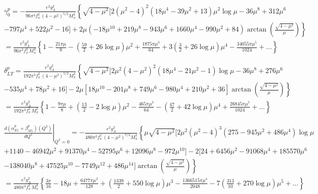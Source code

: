\documentclass[prc,twocolumn,showpacs,preprintnumbers,amsmath,amssymb
,superscriptaddress,a4paper,nofootinbib
]{revtex4-1}
\begin{document}
\begin{widetext}
\begin{align}
&\gamma_0^p = -\frac{e^2 g_A^2}{96\pi^3 f_\pi^2\,  (4-\mu^2)^{5/2} M_\pi^2} \left\{ \sqrt{4-\mu^2} [ 2(\mu^2-4)^2(18 \mu^4 - 39 \mu^2 +13) \mu^2 \log\mu -36 \mu^8 + 312 \mu^6\right. \nonumber\\
&\left.-797\mu^4 +522 \mu^2-16 ] + 2 \mu (-18 \mu^{10} + 219 \mu^8 -943 \mu^6+1660 \mu^4 -990 \mu^2 + 84) \arctan\left( \frac{\sqrt{4-\mu^2}}{\mu}\right) \right\}\nonumber \\
&=\frac{e^2 g_A^2}{96\pi^3 f_\pi^2\,  M_\pi^2}\left\{ 1-\frac{21\pi \mu}{8} - \left(\frac{59}{2} + 26 \log\mu\right)\mu^2 + \frac{1875 \pi \mu^3}{64} + 3\left(\frac{3}{2} + 26 \log\mu\right)\mu^4- \frac{34055 \pi \mu^5}{1024} + \dots \right\}
\end{align}

\begin{align}
&\delta^p_{LT} = \frac{e^2 g_A^2}{192\pi^3 f_\pi^2\, (4-\mu^2)^{5/2} M_\pi^2} \left\{ \sqrt{4-\mu^2} [ 2 \mu^2 (4-\mu^2)^2 (18 \mu^4-21 \mu^2-1) \log\mu -36 \mu^8 + 276 \mu^6 \nonumber \right.\\
&\left. -535 \mu^4+78 \mu^2 +16 ] - 2 \mu [18 \mu^{10} - 201 \mu^8 + 749 \mu^6 -980 \mu^4 +210 \mu^2 +36] \arctan\left( \frac{\sqrt{4-\mu^2}}{\mu} \right)      \right\}\nonumber \\
&=\frac{e^2 g_A^2}{192\pi^3 f_\pi^2\, M_\pi^2} \left\{ 1 - \frac{9 \pi \mu}{8} + \left(\frac{13}{2}-2\log\mu\right)\mu^2 - \frac{465 \pi \mu^3}{64} - \left(\frac{47}{2}+ 42 \log\mu\right)\mu^4  + \frac{26845 \pi \mu^5}{1024} + \dots\right\} 
\end{align}


\begin{align}
&\left.\frac{d(\alpha_{E1}^p+\beta_{M1}^p) (Q^2)}{dQ^2}\right|_{Q^2=0}=-\frac{e^2 g_A^2}{480 \pi^3 f_\pi^2\,  (4-\mu^2)^{7/2} M_\pi^3}\left\{ \mu\sqrt{4-\mu^2} [2\mu^2 (\mu^2-4)^3 (275-945 \mu^2 +486 \mu^4) \log\mu \right. \nonumber \\
&+1140-46942 \mu^2 + 91370 \mu^4-52795 \mu^6 +12096 \mu^8 -972 \mu^{10} ]  -2 [24 +6456\mu^2 -91068 \mu^4 +185570 \mu^6 \nonumber\\
&\left.-138040 \mu^8 +47525\mu^{10} -7749\mu^{12} +486 \mu^{14}] \arctan\left( \frac{\sqrt{4-\mu^2}}{\mu}\right) \right\} \nonumber \\
&= \frac{e^2 g_A^2}{480 \pi^3 f_\pi^2\,  M_\pi^3} \left\{  \frac{3 \pi}{16} -18 \mu + \frac{6477 \pi \mu^2}{128} + \left( \frac{1339}{2} + 550 \log\mu\right)\mu^3 -\frac{1366515 \pi \mu^4}{2048} -7\left( \frac{313}{10} + 270 \log\mu  \right)\mu^5 +\dots  \right\}
\end{align}



\end{widetext}
\end{document}

